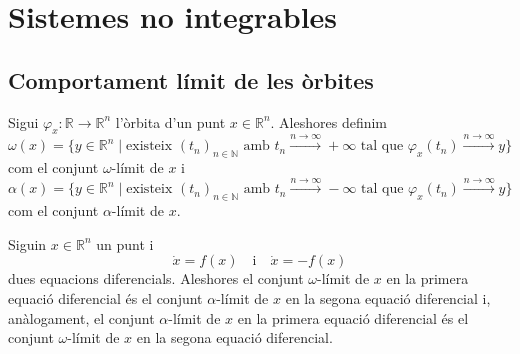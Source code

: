 \documentclass[../../main.tex]{subfiles}
\begin{document}
\section{Sistemes no integrables}
    \subsection{Comportament límit de les òrbites} %
    \begin{definition}
        \label{def:conjunt omega-límit}
        \label{def:conjunt alpha-límit}
        Sigui \(\varphi_{x}\colon\mathbb{R}\longrightarrow\mathbb{R}^{n}\) l'òrbita d'un punt \(x\in\mathbb{R}^{n}\).
        Aleshores definim
        \[
            \omega(x)=\{y\in\mathbb{R}^{n}\mid\text{existeix }(t_{n})_{n\in\mathbb{N}}\text{ amb }t_{n}\overset{n\to\infty}{\longrightarrow}+\infty\text{ tal que }\varphi_{x}(t_{n})\overset{n\to\infty}{\longrightarrow}y\}
        \]
        com el conjunt \(\omega\)-límit de \(x\) i
        \[
            \alpha(x)=\{y\in\mathbb{R}^{n}\mid\text{existeix }(t_{n})_{n\in\mathbb{N}}\text{ amb }t_{n}\overset{n\to\infty}{\longrightarrow}-\infty\text{ tal que }\varphi_{x}(t_{n})\overset{n\to\infty}{\longrightarrow}y\}
        \]
        com el conjunt \(\alpha\)-límit de \(x\).
    \end{definition}
    \begin{observation}
        Siguin \(x\in\mathbb{R}^{n}\) un punt i
        \[
            \dot{x}=f(x)\quad\text{i}\quad\dot{x}=-f(x)
        \]
        dues equacions diferencials.
        Aleshores el conjunt \(\omega\)-límit de \(x\) en la primera equació diferencial és el conjunt \(\alpha\)-límit de \(x\) en la segona equació diferencial i, anàlogament, el conjunt \(\alpha\)-límit de \(x\) en la primera equació diferencial és el conjunt \(\omega\)-límit de \(x\) en la segona equació diferencial.
    \end{observation}
\end{document}
